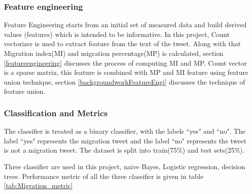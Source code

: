 \subsubsection{Feature engineering }
Feature Engineering starts from an initial set of measured data and
build derived values (features) which is intended to be informative. In this project, Count vectorizer is used to extract feature from the text of the tweet. Along with that Migration index(MI) and migration percentage(MP) is calculated, section \ref{featureengineering} discusses the process of computing MI and MP. Count vector is a sparse matrix, this feature is combined with MP and MI feature using feature union technique, section \ref{backgroundworkFeatureEngi} discusses the technique of feature union.  

\subsubsection{Classification and Metrics}
The classifier is treated as a binary classifier, with the labels ``yes" and ``no". The label ``yes" represents the  migration tweet and the label ``no" represents the tweet is not a migration tweet. The dataset is split into train(75\%) and test sets(25\%). 

Three classifier are used in this project, naive Bayes, Logistic regression, decision trees. Performance metric of all the three classifier is given in table \ref{tab:Migration_metric}

